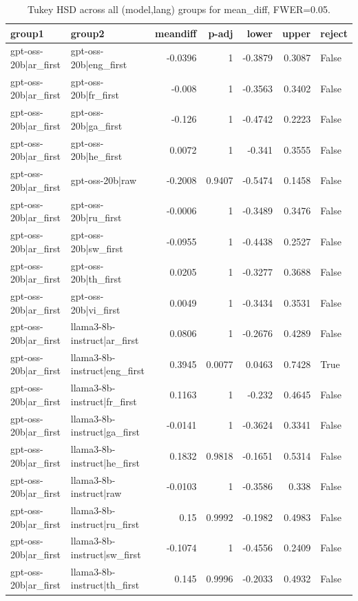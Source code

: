 \begin{table}
\caption{Tukey HSD across all (model,lang) groups for mean_diff, FWER=0.05.}
\label{tab:tukey_all_models_all_langs_mean_diff}
\begin{tabular}{l l r r r r l}
\toprule
group1 & group2 & meandiff & p-adj & lower & upper & reject \\
\midrule
gpt-oss-20b|ar_first & gpt-oss-20b|eng_first & -0.0396 & 1 & -0.3879 & 0.3087 & False \\
gpt-oss-20b|ar_first & gpt-oss-20b|fr_first & -0.008 & 1 & -0.3563 & 0.3402 & False \\
gpt-oss-20b|ar_first & gpt-oss-20b|ga_first & -0.126 & 1 & -0.4742 & 0.2223 & False \\
gpt-oss-20b|ar_first & gpt-oss-20b|he_first & 0.0072 & 1 & -0.341 & 0.3555 & False \\
gpt-oss-20b|ar_first & gpt-oss-20b|raw & -0.2008 & 0.9407 & -0.5474 & 0.1458 & False \\
gpt-oss-20b|ar_first & gpt-oss-20b|ru_first & -0.0006 & 1 & -0.3489 & 0.3476 & False \\
gpt-oss-20b|ar_first & gpt-oss-20b|sw_first & -0.0955 & 1 & -0.4438 & 0.2527 & False \\
gpt-oss-20b|ar_first & gpt-oss-20b|th_first & 0.0205 & 1 & -0.3277 & 0.3688 & False \\
gpt-oss-20b|ar_first & gpt-oss-20b|vi_first & 0.0049 & 1 & -0.3434 & 0.3531 & False \\
gpt-oss-20b|ar_first & llama3-8b-instruct|ar_first & 0.0806 & 1 & -0.2676 & 0.4289 & False \\
gpt-oss-20b|ar_first & llama3-8b-instruct|eng_first & 0.3945 & 0.0077 & 0.0463 & 0.7428 & True \\
gpt-oss-20b|ar_first & llama3-8b-instruct|fr_first & 0.1163 & 1 & -0.232 & 0.4645 & False \\
gpt-oss-20b|ar_first & llama3-8b-instruct|ga_first & -0.0141 & 1 & -0.3624 & 0.3341 & False \\
gpt-oss-20b|ar_first & llama3-8b-instruct|he_first & 0.1832 & 0.9818 & -0.1651 & 0.5314 & False \\
gpt-oss-20b|ar_first & llama3-8b-instruct|raw & -0.0103 & 1 & -0.3586 & 0.338 & False \\
gpt-oss-20b|ar_first & llama3-8b-instruct|ru_first & 0.15 & 0.9992 & -0.1982 & 0.4983 & False \\
gpt-oss-20b|ar_first & llama3-8b-instruct|sw_first & -0.1074 & 1 & -0.4556 & 0.2409 & False \\
gpt-oss-20b|ar_first & llama3-8b-instruct|th_first & 0.145 & 0.9996 & -0.2033 & 0.4932 & False \\

\end{tabular}
\end{table}
